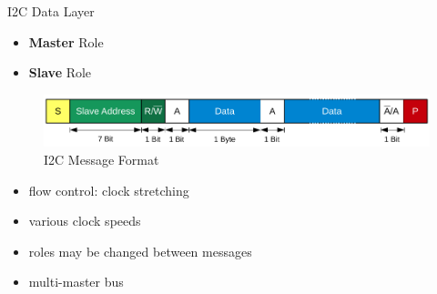 \documentclass{beamer}
\renewcommand{\emph}[1]{\textbf{\textcolor{greeniot2}{#1}}}
\begin{document}
\begin{frame}{I2C Data Layer}
  \begin{itemize}
    \item \emph{Master} Role
  
    \item \emph{Slave} Role
  \end{itemize}
  
  \begin{figure}[H]
    \includegraphics[width=\textwidth]{images/i2c-message.pdf}
    \caption{I2C Message Format}
  \end{figure}
  
  \begin{itemize}
    \item flow control: clock stretching
    \item various clock speeds
    \item roles may be changed between messages
    \item multi-master bus
  \end{itemize}
\end{frame}
\end{document}
